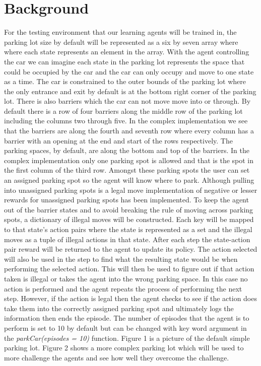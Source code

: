 \documentclass[letterpaper]{article}
\begin{document}
\section{Background}

For the testing environment that our learning agents will be trained in, the parking lot size by default will be represented as a six by seven array where where each state represents an element in the array. With the agent controlling the car we can imagine each state in the parking lot represents the space that could be occupied by the car and the car can only occupy and move to one state as a time. The car is constrained to the outer bounds of the parking lot where the only entrance and exit by default is at the bottom right corner of the parking lot. There is also barriers which the car can not move move into or through.  By default there is a row of four barriers along the middle row of the parking lot including the columns two through five.  In the complex implementation we see that the barriers are along the fourth and seventh row where every column has a barrier with an opening at the end and start of the rows respectively.  The parking spaces, by default, are along the bottom and top of the barriers.  In the complex implementation only one parking spot is allowed and that is the spot in the first column of the third row.   Amongst these parking spots the user can set an assigned parking spot so the agent will know where to park.  Although pulling into unassigned parking spots is a legal move implementation of negative or lesser rewards for unassigned parking spots has been implemented.  To keep the agent out of the barrier states and to avoid breaking the rule of moving  across parking spots, a dictionary of illegal moves will be constructed. Each key will be mapped to that state's action pairs where the state is represented as a set and the illegal moves as a tuple of illegal actions in that state.  After each step the state-action pair reward will be returned to the agent to update its policy.  The action selected will also be used in the step to find what the resulting state would be when performing the selected action.  This will then be used to figure out if that action taken is illegal or takes the agent into the wrong parking space.  In this case no action is performed and the agent repeats the process of performing the next step.  However, if the action is legal then the agent checks to see if the action does take them into the correctly assigned parking spot and ultimately logs the information then ends the episode.  The number of episodes that the agent is to perform is set to 10 by default but can be changed with key word argument in the \textit{parkCar(episodes = 10)} function. Figure 1 is a picture of the default simple parking lot.  Figure 2 shows a more complex parking lot which will be used to more challenge the agents and see how well they overcome the challenge.
\end{document}
